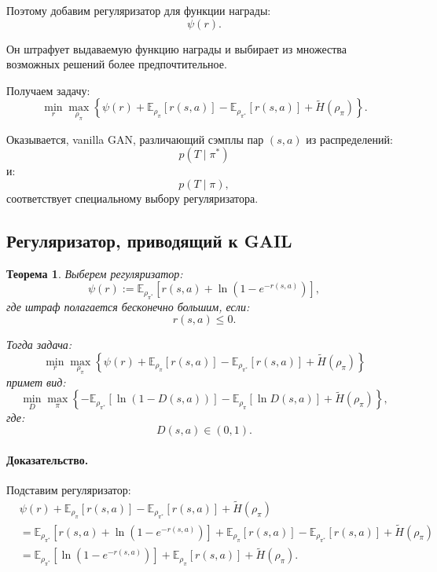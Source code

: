 \documentclass[12pt,a4paper]{article}
\newtheorem{theorem}{Теорема}
\begin{document}
Поэтому добавим регуляризатор для функции награды:
\[
\psi(r).
\]

Он штрафует выдаваемую функцию награды и выбирает из множества возможных решений более предпочтительное.

Получаем задачу:
\[
\min_r
\max_{\rho_\pi}
\left\{
\psi(r)
+
\mathbb E_{\rho_\pi}
\left[
r(s,a)
\right]
-
\mathbb E_{\rho_{\pi^\ast}}
\left[
r(s,a)
\right]
+
\widetilde H(\rho_\pi)
\right\}.
\]

Оказывается, vanilla GAN, различающий сэмплы пар $(s,a)$ из распределений:
\[
p(T\mid\pi^\ast)
\]
и:
\[
p(T\mid\pi),
\]
соответствует специальному выбору регуляризатора.

\subsection{Регуляризатор, приводящий к GAIL}

\begin{theorem}
Выберем регуляризатор:
\[
\psi(r)
:=
\mathbb E_{\rho_{\pi^\ast}}
\left[
r(s,a)
+
\ln
\left(
1-e^{-r(s,a)}
\right)
\right],
\]
где штраф полагается бесконечно большим, если:
\[
r(s,a)\le 0.
\]

Тогда задача:
\[
\min_r
\max_{\rho_\pi}
\left\{
\psi(r)
+
\mathbb E_{\rho_\pi}
\left[
r(s,a)
\right]
-
\mathbb E_{\rho_{\pi^\ast}}
\left[
r(s,a)
\right]
+
\widetilde H(\rho_\pi)
\right\}
\]
примет вид:
\[
\min_D
\max_\pi
\left\{
-
\mathbb E_{\rho_{\pi^\ast}}
\left[
\ln(1-D(s,a))
\right]
-
\mathbb E_{\rho_\pi}
\left[
\ln D(s,a)
\right]
+
\widetilde H(\rho_\pi)
\right\},
\]
где:
\[
D(s,a)\in(0,1).
\]
\end{theorem}

\paragraph{Доказательство.}

Подставим регуляризатор:
\[
\begin{aligned}
&
\psi(r)
+
\mathbb E_{\rho_\pi}
\left[
r(s,a)
\right]
-
\mathbb E_{\rho_{\pi^\ast}}
\left[
r(s,a)
\right]
+
\widetilde H(\rho_\pi)
\\
&=
\mathbb E_{\rho_{\pi^\ast}}
\left[
r(s,a)
+
\ln(1-e^{-r(s,a)})
\right]
+
\mathbb E_{\rho_\pi}
\left[
r(s,a)
\right]
-
\mathbb E_{\rho_{\pi^\ast}}
\left[
r(s,a)
\right]
+
\widetilde H(\rho_\pi)
\\
&=
\mathbb E_{\rho_{\pi^\ast}}
\left[
\ln(1-e^{-r(s,a)})
\right]
+
\mathbb E_{\rho_\pi}
\left[
r(s,a)
\right]
+
\widetilde H(\rho_\pi).
\end{aligned}
\]
\end{document}
